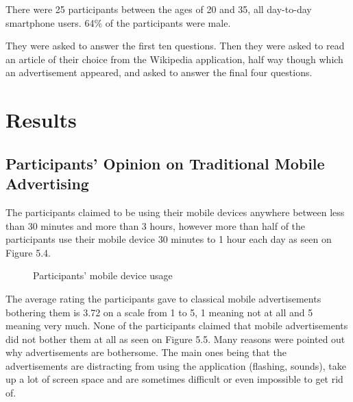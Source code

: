There were 25 participants between the ages of 20 and 35, all day-to-day smartphone users. 64\% of the participants were male.

They were asked to answer the first ten questions. Then they were asked to read an article of their choice from the Wikipedia application, half way though which an advertisement appeared, and asked to answer the final four questions.

\section{Results}

\subsection{Participants' Opinion on Traditional Mobile Advertising}

The participants claimed to be using their mobile devices anywhere between less than 30 minutes and more than 3 hours, however more than half of the participants use their mobile device 30 minutes to 1 hour each day as seen on Figure 5.4.

\begin{figure}
\begin{center}
\caption{Participants' mobile device usage}
\end{center}
\end{figure}

The average rating the participants gave to classical mobile advertisements bothering them is 3.72 on a scale from 1 to 5, 1 meaning not at all and 5 meaning very much. None of the participants claimed that mobile advertisements did not bother them at all as seen on Figure 5.5. Many reasons were pointed out why advertisements are bothersome. The main ones being that the advertisements are distracting from using the application (flashing, sounds), take up a lot of screen space and are sometimes difficult or even impossible to get rid of.

